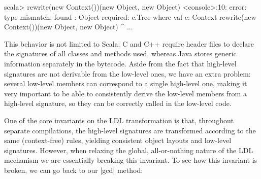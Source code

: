 \begin{lstlisting-nobreak}
scala> rewrite(new Context())(new Object, new Object)
<console>:10: error: type mismatch;
 found   : Object
 required: c.Tree where val c: Context
              rewrite(new Context())(new Object, new Object)
                                            ^
...
\end{lstlisting-nobreak}

This behavior is not limited to Scala: C and C++ require header files to declare the signatures of all classes and methods used, whereas Java stores generic information separately in the bytecode. Aside from the fact that high-level signatures are not derivable from the low-level ones, we have an extra problem: several low-level members can correspond to a single high-level one, making it very important to be able to consistently derive the low-level members from a high-level signature, so they can be correctly called in the low-level code.

One of the core invariants on the LDL transformation is that, throughout separate compilations, the high-level signatures are transformed according to the same (context-free) rules, yielding consistent object layouts and low-level signatures. However, when relaxing the global, all-or-nothing nature of the LDL mechanism we are essentially breaking this invariant.
%
%
%
%
%
%
To see how this invariant is broken, we can go back to our |gcd| method:

